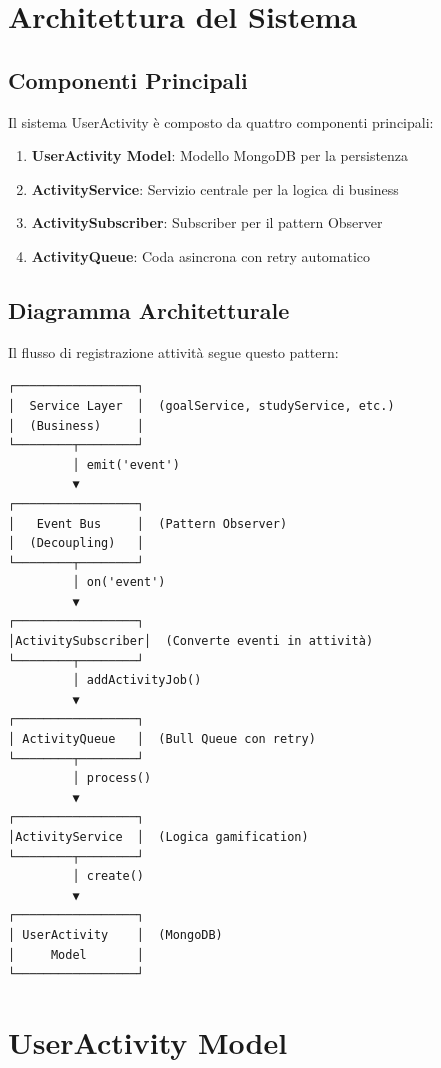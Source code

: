 \documentclass[11pt,a4paper]{article}
\begin{document}
\section{Architettura del Sistema}

\subsection{Componenti Principali}

Il sistema UserActivity è composto da quattro componenti principali:

\begin{enumerate}
    \item \textbf{UserActivity Model}: Modello MongoDB per la persistenza
    \item \textbf{ActivityService}: Servizio centrale per la logica di business
    \item \textbf{ActivitySubscriber}: Subscriber per il pattern Observer
    \item \textbf{ActivityQueue}: Coda asincrona con retry automatico
\end{enumerate}

\subsection{Diagramma Architetturale}

Il flusso di registrazione attività segue questo pattern:

\begin{verbatim}
┌─────────────────┐
│  Service Layer  │  (goalService, studyService, etc.)
│  (Business)     │
└────────┬────────┘
         │ emit('event')
         ▼
┌─────────────────┐
│   Event Bus     │  (Pattern Observer)
│  (Decoupling)   │
└────────┬────────┘
         │ on('event')
         ▼
┌─────────────────┐
│ActivitySubscriber│  (Converte eventi in attività)
└────────┬────────┘
         │ addActivityJob()
         ▼
┌─────────────────┐
│ ActivityQueue   │  (Bull Queue con retry)
└────────┬────────┘
         │ process()
         ▼
┌─────────────────┐
│ActivityService  │  (Logica gamification)
└────────┬────────┘
         │ create()
         ▼
┌─────────────────┐
│ UserActivity    │  (MongoDB)
│     Model       │
└─────────────────┘
\end{verbatim}

\section{UserActivity Model}
\end{document}
